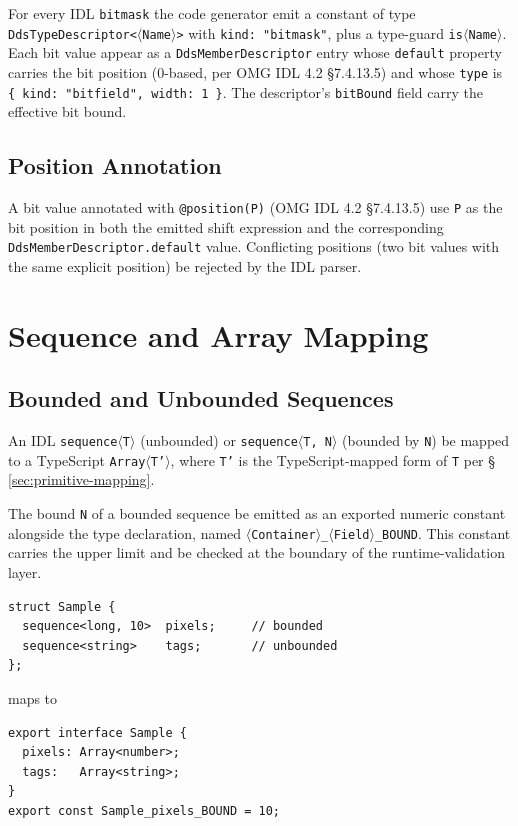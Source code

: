 \documentclass{../styles/zerodds-vendor-spec}
\begin{document}
For every IDL \texttt{bitmask} the code generator 
emit a constant of type
\texttt{DdsTypeDescriptor<$\langle$Name$\rangle$>} with
\texttt{kind:\,"bitmask"}, plus a type-guard
\texttt{is$\langle$Name$\rangle$}. Each bit value 
appear as a \texttt{DdsMemberDescriptor} entry whose
\texttt{default} property carries the bit position (0-based, per
OMG IDL 4.2 §7.4.13.5) and whose \texttt{type} is
\texttt{\{ kind:\,"bitfield",\,width:\,1 \}}. The descriptor's
\texttt{bitBound} field  carry the effective bit
bound.

\subsection{Position Annotation}

A bit value annotated with \texttt{@position(P)} (OMG IDL 4.2
§7.4.13.5)  use \texttt{P} as the bit position in
both the emitted shift expression and the corresponding
\texttt{DdsMemberDescriptor.default} value. Conflicting positions
(two bit values with the same explicit position)  be
rejected by the IDL parser.

\section{Sequence and Array Mapping}\label{sec:sequence-array-mapping}

\subsection{Bounded and Unbounded Sequences}

An IDL \texttt{sequence$\langle$T$\rangle$} (unbounded) or
\texttt{sequence$\langle$T,\,N$\rangle$} (bounded by \texttt{N})
 be mapped to a TypeScript
\texttt{Array$\langle$T'$\rangle$}, where \texttt{T'} is the
TypeScript-mapped form of \texttt{T} per
\S\,\ref{sec:primitive-mapping}.

The bound \texttt{N} of a bounded sequence  be
emitted as an exported numeric constant alongside the type
declaration, named
\texttt{$\langle$Container$\rangle$\_$\langle$Field$\rangle$\_BOUND}.
This constant carries the upper limit and  be
checked at the boundary of the runtime-validation layer.

\begin{specexample}
\begin{lstlisting}
struct Sample {
  sequence<long, 10>  pixels;     // bounded
  sequence<string>    tags;       // unbounded
};
\end{lstlisting}
maps to
\begin{lstlisting}
export interface Sample {
  pixels: Array<number>;
  tags:   Array<string>;
}
export const Sample_pixels_BOUND = 10;
\end{lstlisting}
\end{specexample}
\end{document}

